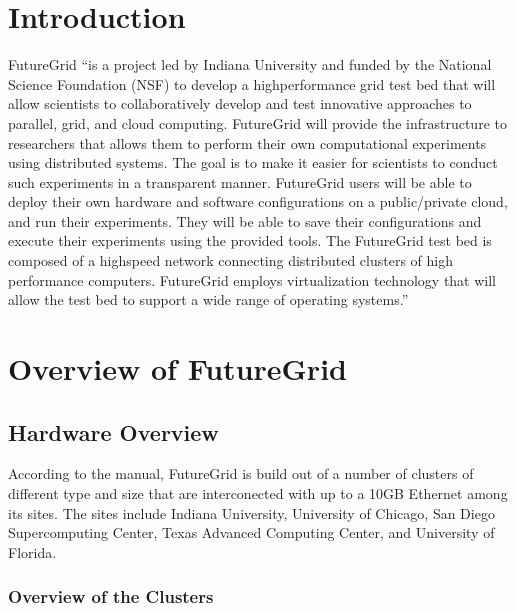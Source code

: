 \documentclass{article}
\newcommand{\FILE}[1]{\todo[color=green!40]{#1}}
\begin{document}

\FILE{introduction.tex}

\section{Introduction}

FutureGrid \cite{las2010gce,las12fg-bookchapter}``is a project led by Indiana University and funded by the National Science Foundation (NSF) to develop a highperformance grid test bed that will allow scientists to collaboratively develop and test innovative approaches to parallel, grid, and cloud computing. FutureGrid will provide the infrastructure to researchers that allows them to perform their own computational experiments using distributed systems. The goal is to make it easier for scientists to conduct such experiments in a transparent manner.  FutureGrid users will be able to deploy their own hardware and software configurations on a public/private cloud, and run their experiments. They will be able to save their configurations and execute their experiments using the provided tools. The FutureGrid test bed is composed of a highspeed network connecting distributed clusters of high performance computers. FutureGrid employs virtualization technology that will allow the test bed to support a wide range of operating systems.''



\section{Overview of FutureGrid}

\FILE{hardware.tex}

\subsection{Hardware Overview}

According to the manual, FutureGrid is build out of a number of clusters of different type and size that are interconected with up to a 10GB Ethernet among its sites. The sites include Indiana University, University of Chicago, San Diego Supercomputing Center, Texas Advanced Computing Center, and University of Florida.

\subsubsection{Overview of the Clusters}\label{S:hw-cluster} 
\end{document}
